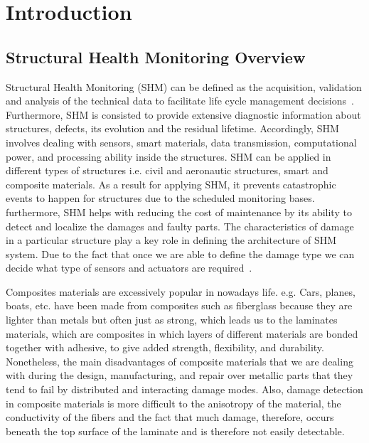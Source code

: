 \documentclass[preprint,9pt]{elsarticle}
\begin{document}
	\section{Introduction}
	\subsection{Structural Health Monitoring Overview}
Structural Health Monitoring (SHM) can be defined as the acquisition, validation and analysis of the technical data to facilitate life cycle management decisions~\cite{R.1999}. Furthermore, SHM is consisted to provide extensive diagnostic information about structures, defects, its evolution and the residual lifetime. Accordingly, SHM involves dealing with sensors, smart materials, data transmission, computational power, and processing ability inside the structures. SHM can be applied in different types of structures i.e. civil and aeronautic structures, smart and composite materials. As a result for applying SHM, it prevents catastrophic events to happen for structures due to the scheduled monitoring bases. furthermore, SHM helps with reducing the cost of maintenance by its ability to detect and localize the damages and faulty parts. The characteristics of damage in a particular structure play a key role in defining the architecture of  SHM system. Due to the fact that once we are able to define the damage type we can decide what type of sensors and actuators are required~\cite{Kessler2002}. 

Composites materials are excessively popular in nowadays life. e.g. Cars, planes, boats, etc. have been made from composites such as fiberglass because they are lighter than metals but often just as strong, which leads us to the laminates materials, which are composites in which layers of different materials are bonded together with adhesive, to give added strength, flexibility, and durability. Nonetheless, the main disadvantages of composite materials that we are dealing with during the design, manufacturing, and repair over metallic parts that they tend to fail by distributed and interacting damage modes. Also, damage detection in composite materials is more difficult to the anisotropy of the material, the conductivity of the fibers and the fact that much damage, therefore, occurs beneath the top surface of the laminate and is therefore not easily detectable.
\end{document}
